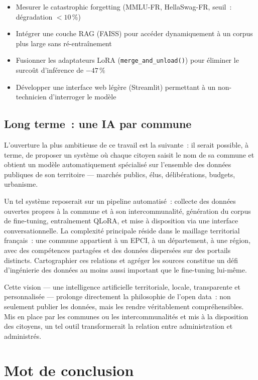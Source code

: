\begin{itemize}
    \item Mesurer le catastrophic forgetting (MMLU-FR, HellaSwag-FR, seuil~: dégradation $< 10\,\%$)
    \item Intégrer une couche RAG (FAISS) pour accéder dynamiquement à un corpus plus large sans ré-entraînement
    \item Fusionner les adaptateurs LoRA (\texttt{merge\_and\_unload()}) pour éliminer le surcoût d'inférence de $-47\,\%$
    \item Développer une interface web légère (Streamlit) permettant à un non-technicien d'interroger le modèle
\end{itemize}

\subsection{Long terme~: une IA par commune}

L'ouverture la plus ambitieuse de ce travail est la suivante~: il serait possible, à terme, de proposer un système où chaque citoyen saisit le nom de sa commune et obtient un modèle automatiquement spécialisé sur l'ensemble des données publiques de son territoire --- marchés publics, élus, délibérations, budgets, urbanisme.

Un tel système reposerait sur un pipeline automatisé~: collecte des données ouvertes propres à la commune et à son intercommunalité, génération du corpus de fine-tuning, entraînement QLoRA, et mise à disposition via une interface conversationnelle. La complexité principale réside dans le maillage territorial français~: une commune appartient à un EPCI, à un département, à une région, avec des compétences partagées et des données dispersées sur des portails distincts. Cartographier ces relations et agréger les sources constitue un défi d'ingénierie des données au moins aussi important que le fine-tuning lui-même.

Cette vision --- une intelligence artificielle territoriale, locale, transparente et personnalisée --- prolonge directement la philosophie de l'open data~: non seulement publier les données, mais les rendre véritablement compréhensibles. Mis en place par les communes ou les intercommunalités et mis à la disposition des citoyens, un tel outil transformerait la relation entre administration et administrés.

\section{Mot de conclusion}

